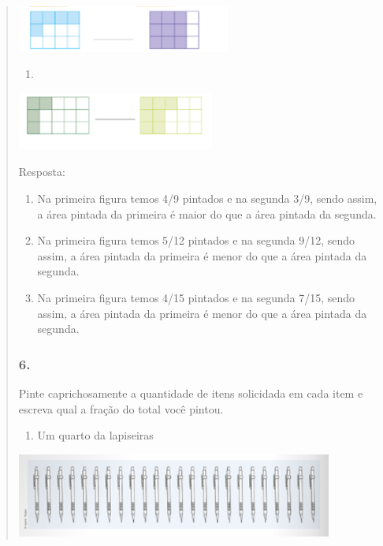 \begin{enumerate}
\begin{escolha}
\begin{enumerate}
\begin{itemize}
\begin{itemize}
\begin{escolha}
\begin{quote}
\begin{escolha}
{\includegraphics[width=2.75857in,height=0.60005in]{media/image109.png}

\begin{enumerate}
\def\labelenumi{\alph{enumi})}
\item
\end{enumerate}

\includegraphics[width=2.55022in,height=0.75006in]{media/image110.png}

Resposta:

\begin{enumerate}
\def\labelenumi{\alph{enumi})}
\item
  Na primeira figura temos 4/9 pintados e na segunda 3/9, sendo assim, a
  área pintada da primeira é maior do que a área pintada da segunda.
\item
  Na primeira figura temos 5/12 pintados e na segunda 9/12, sendo assim,
  a área pintada da primeira é menor do que a área pintada da segunda.
\item
  Na primeira figura temos 4/15 pintados e na segunda 7/15, sendo assim,
  a área pintada da primeira é menor do que a área pintada da segunda.
\end{enumerate}

\subsubsection{6. }\label{section-109}

Pinte caprichosamente a quantidade de itens solicidada em cada item e
escreva qual a fração do total você pintou.

\begin{enumerate}
\def\labelenumi{\alph{enumi})}
\item
  Um quarto da lapiseiras
\end{enumerate}

\includegraphics[width=4.09202in,height=1.08343in]{media/image111.png}

}
\end{escolha}
\end{quote}
\end{escolha}
\end{itemize}
\end{itemize}
\end{enumerate}
\end{escolha}
\end{enumerate}
